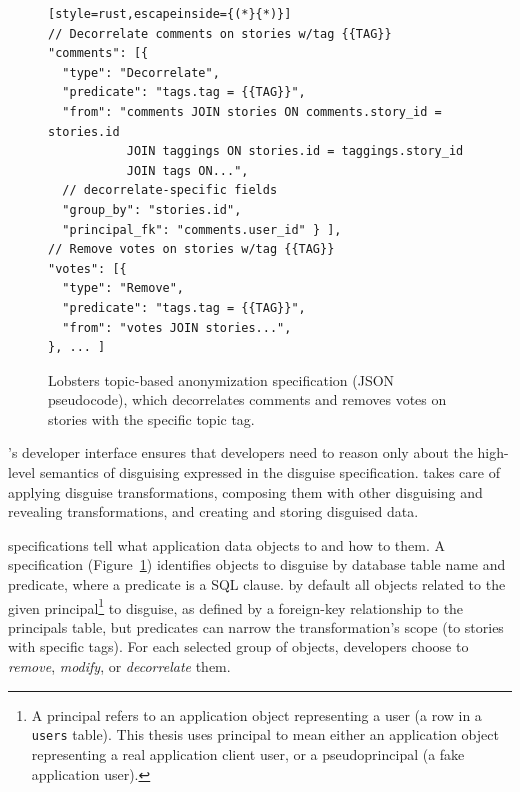 \begin{figure}[t]
\centering
\begin{lstlisting}[style=rust,escapeinside={(*}{*)}]
// Decorrelate comments on stories w/tag {{TAG}}
"comments": [{
  "type": "Decorrelate",
  "predicate": "tags.tag = {{TAG}}",
  "from": "comments JOIN stories ON comments.story_id = stories.id
           JOIN taggings ON stories.id = taggings.story_id
           JOIN tags ON...",
  // decorrelate-specific fields 
  "group_by": "stories.id",
  "principal_fk": "comments.user_id" } ],
// Remove votes on stories w/tag {{TAG}}
"votes": [{
  "type": "Remove",
  "predicate": "tags.tag = {{TAG}}",
  "from": "votes JOIN stories...",
}, ... ]
\end{lstlisting}
    \caption[Lobsters topic-based anonymization disguise specification.]{Lobsters topic-based anonymization \xx specification (JSON
    pseudocode), which decorrelates comments and removes votes on stories with
    the specific topic tag.}
\label{f:spec}
\end{figure}


\sys's developer interface ensures that developers need to reason only
about the high-level semantics of disguising expressed in the disguise
specification. \sys takes care of applying disguise transformations, composing
them with other disguising and revealing transformations, and creating and storing
disguised data.


\Xx specifications tell \sys what application data objects to \xx and how to \xx
them.
%
A \xx specification (Figure~\ref{f:spec}) identifies objects to disguise by
database table name and predicate, where a predicate is a SQL  clause.
%
\sys by default \xxs all objects related to the given principal\footnote{A
principal refers to an application object representing a user (\eg a row in a
\texttt{users} table). This thesis uses principal to mean either an 
application object representing a real application client user, or a
pseudoprincipal (a fake application user).} to disguise, as
defined by a foreign-key relationship to the principals table, but predicates
can narrow the transformation's scope (\eg to stories with specific tags).
%
For each selected group of objects, developers choose to \emph{remove},
\emph{modify}, or \emph{decorrelate} them.
%

